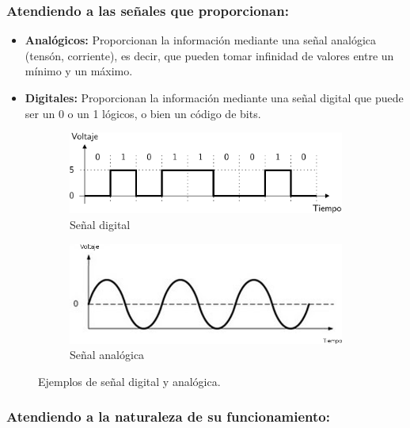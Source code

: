 \subsubsection{Atendiendo a las señales que proporcionan:}

\begin{itemize}
 \item \textbf{Analógicos:} Proporcionan la información mediante una señal analógica (tensón, corriente), es decir, que pueden tomar infinidad de valores entre un mínimo y
 un máximo.
 \item \textbf{Digitales:} Proporcionan la información mediante una señal digital que puede ser un 0 o un 1 lógicos, o bien un código de bits.
\end{itemize}

\begin{figure}[H]
    \centering
    \begin{subfigure}[b]{0.4\textwidth}
        \includegraphics[width=\textwidth]{imagenes/senal_digital.png}
        \caption{Señal digital}
        \label{fig:gull}
    \end{subfigure}
    \begin{subfigure}[b]{0.26\textwidth}
        \includegraphics[width=1.19\textwidth]{imagenes/senal_analogica.png}
        \caption{Señal analógica}
        \label{fig:tiger}
    \end{subfigure}
    \caption{Ejemplos de señal digital y analógica.}\label{fig:animals}
\end{figure}

\subsubsection{Atendiendo a la naturaleza de su funcionamiento:}

